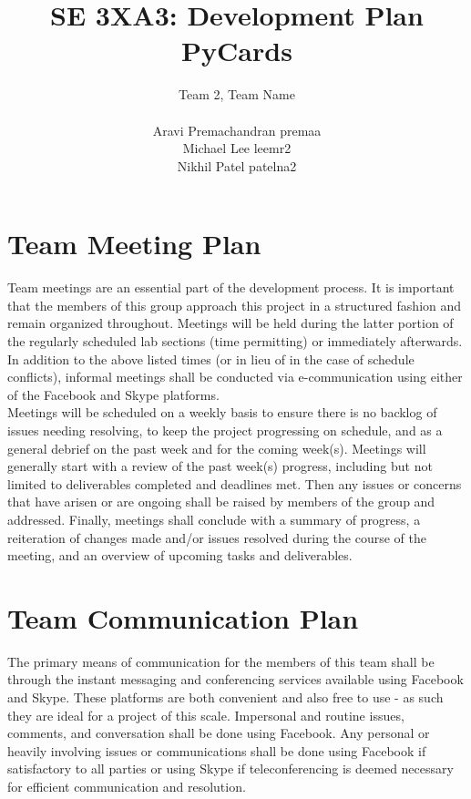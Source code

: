 \documentclass{article}
\title{SE 3XA3: Development Plan\\PyCards}
\author{Team 2, Team Name \\ \\ Aravi Premachandran premaa \\ Michael Lee leemr2
\\ Nikhil Patel patelna2 }
\date{}
\begin{document}
\maketitle


\section{Team Meeting Plan}

\noindent Team meetings are an essential part of the development process. It is
important that the members of this group approach this project in a structured
fashion and remain organized throughout. Meetings will be held during the latter
portion of the regularly scheduled lab sections (time permitting) or immediately
afterwards. In addition to the above listed times (or in lieu of in the case of
schedule conflicts), informal meetings shall be conducted via e-communication
using either of the Facebook and Skype platforms.\\Meetings will be scheduled on
a weekly basis to ensure there is no backlog of issues needing resolving, to
keep the project progressing on schedule, and as a general debrief on the past
week and for the coming week(s). Meetings will generally start with a review of
the past week(s) progress, including but not limited to deliverables completed
and deadlines met. Then any issues or concerns that have arisen or are ongoing
shall be raised by members of the group and addressed. Finally, meetings shall
conclude with a summary of progress, a reiteration of changes made and/or issues
resolved during the course of the meeting, and an overview of upcoming tasks and
deliverables.

\section{Team Communication Plan}

\noindent The primary means of communication for the members of this team shall
be through the instant messaging and conferencing services available using
Facebook and Skype. These platforms are both convenient and also free to use -
as such they are ideal for a project of this scale. Impersonal and routine
issues, comments, and conversation shall be done using Facebook. Any personal or
heavily involving issues or communications shall be done using Facebook if
satisfactory to all parties or using Skype if teleconferencing is deemed
necessary for efficient communication and resolution.
\end{document}
